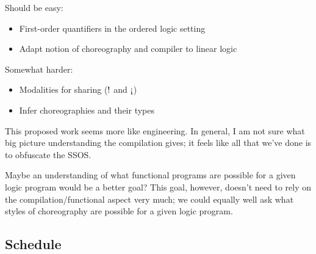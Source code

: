 Should be easy:
\begin{itemize}
\item First-order quantifiers in the ordered logic setting
\item Adapt notion of choreography and compiler to linear logic
\end{itemize}
Somewhat harder:
\begin{itemize}
\item Modalities for sharing ($\mathord{!}$ and $\mathord{\text{!`}}$)
\item Infer choreographies and their types
\end{itemize}

This proposed work seems more like engineering.
In general, I am not sure what big picture understanding the compilation gives; it feels like all that we've done is to obfuscate the SSOS.

Maybe an understanding of what functional programs are possible for a given logic program would be a better goal?
This goal, however, doesn't need to rely on the compilation/functional aspect very much;
we could equally well ask what styles of choreography are possible for a given logic program.


\subsection{Schedule}\label{sec:schedule}


